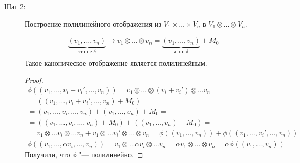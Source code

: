\begin{description}
\item[Шаг 2:]
	Построение полилинейного отображения из $V_1 \times \dots \times V_n$ в $V_1 \otimes \dots \otimes V_n$.
	\begin{theorem}
	\begin{gather*}
		\underbrace{(v_1, \dots, v_n)}_{\text{это не $\delta$}} \to v_1 \otimes \dots \otimes v_n = \underbrace{(v_1, \dots, v_n)}_{\text{а это $\delta$}} + M_0 \\
	\end{gather*}
	Такое каноническое отображение является полилинейным.
	\end{theorem}
	\begin{proof}
	\begin{gather*}
		\phi((v_1, \dots, v_i + v_i', \dots, v_n))
		= v_1 \otimes \dots \otimes (v_i + v_i') \otimes \dots v_n = \\
		= ((v_1, \dots, v_i + v_i', \dots, v_n) + M_0) = \\
		=  (v_1, \dots, v_i, \dots, v_n) + (v_1, \dots, v_n) + M_0 = \\
		= ((v_1, \dots, v_i, \dots, v_n) + M_0) + ((v_1,\dots, v_n) + M_0) = \\
		= v_1 \otimes \dots v_i \otimes \dots v_n + v_1 \otimes \dots v_i' \otimes \dots \otimes v_n
		= \phi ((v_1, \dots, v_n)) + \phi((v_1, \dots, v_i', \dots, v_n)) \\
		\phi((v_1, \dots, \alpha v_i, \dots, v_n))
		= v_1 \otimes \dots \alpha v_i \otimes \dots v_n
		= \alpha v_1 \otimes \dots \otimes v_n
		= \alpha \phi((v_1, \dots, v_n))
	\end{gather*}
	Получили, что $\phi$ "--- полилинейно.
	\end{proof}  


\end{description}
